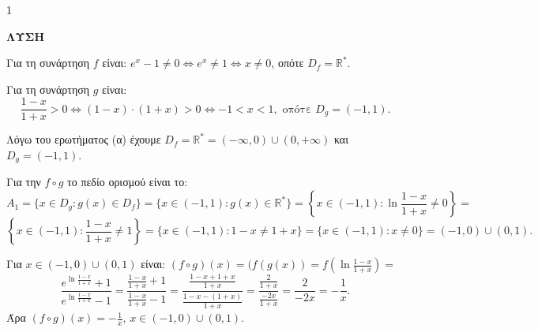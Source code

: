 \begin{ylh}{1}
    \item [Ύλη από εικόνα]
\end{ylh}
\textbf{ΛΥΣΗ}
\begin{alist}
    \item [α)] Για τη συνάρτηση $f$ είναι: $e^x - 1 \neq 0 \Leftrightarrow e^x \neq 1 \Leftrightarrow x \neq 0$, οπότε $D_f = \mathbb{R}^*$.

    Για τη συνάρτηση $g$ είναι:
    \[ \frac{1-x}{1+x} > 0 \Leftrightarrow (1-x) \cdot (1+x) > 0 \Leftrightarrow -1 < x < 1, \text{ οπότε } D_g = (-1,1). \]

    \item [β)] Λόγω του ερωτήματος (α) έχουμε $D_f = \mathbb{R}^* = (-\infty,0) \cup (0,+\infty)$ και $D_g = (-1,1)$.

    Για την $f \circ g$ το πεδίο ορισμού είναι το:
    \[ A_1 = \{x \in D_g : g(x) \in D_f \} = \{x \in (-1,1) : g(x) \in \mathbb{R}^* \} = \left\{ x \in (-1,1) : \ln \frac{1-x}{1+x} \neq 0 \right\} = \]
    \[ \left\{ x \in (-1,1) : \frac{1-x}{1+x} \neq 1 \right\} = \{x \in (-1,1) : 1-x \neq 1+x \} = \{x \in (-1,1) : x \neq 0 \} = (-1,0) \cup (0,1). \]

    \item [γ)] Για $x \in (-1,0) \cup (0,1)$ είναι: $(f \circ g)(x)=(f(g(x))=f\left(\ln \frac{1-x}{1+x}\right)=$
    \[ \frac{e^{\ln \frac{1-x}{1+x}}+1}{e^{\ln \frac{1-x}{1+x}}-1} = \frac{\frac{1-x}{1+x}+1}{\frac{1-x}{1+x}-1} = \frac{\frac{1-x+1+x}{1+x}}{\frac{1-x-(1+x)}{1+x}} = \frac{\frac{2}{1+x}}{\frac{-2x}{1+x}} = \frac{2}{-2x} = -\frac{1}{x}. \]
    Άρα $(f \circ g)(x) = -\frac{1}{x}$, $x \in (-1,0) \cup (0,1)$.
\end{alist}